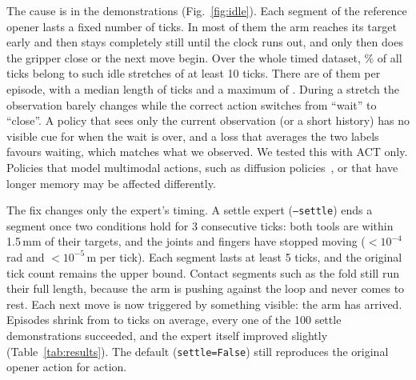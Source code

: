 \documentclass[10pt,twocolumn,letterpaper]{article}
\newcommand{\ttt}[1]{\texttt{\small #1}}
\begin{document}
The cause is in the demonstrations (Fig.~\ref{fig:idle}). Each segment of the reference opener lasts a fixed
number of ticks. In most of them the arm reaches its target early and then stays completely still until the
clock runs out, and only then does the gripper close or the next move begin. Over the whole timed dataset,
\TimedIdlePct\% of all ticks belong to such idle stretches of at least 10 ticks. There are \TimedIdleRuns{} of
them per episode, with a median length of \TimedIdleMedian{} ticks and a maximum of \TimedIdleMax. During a
stretch the observation barely changes while the correct action switches from ``wait'' to ``close''. A policy
that sees only the current observation (or a short history) has no visible cue for when the wait is over, and
a loss that averages the two labels favours waiting, which matches what we observed. We tested this with ACT
only. Policies that model multimodal actions, such as diffusion policies~\cite{diffusion_policy}, or that have
longer memory may be affected differently.

The fix changes only the expert's timing. A settle expert (\ttt{--settle}) ends a segment once two conditions
hold for 3 consecutive ticks: both tools are within 1.5\,mm of their targets, and the joints and fingers have
stopped moving ($<10^{-4}$\,rad and $<10^{-5}$\,m per tick). Each segment lasts at least 5 ticks, and the
original tick count remains the upper bound. Contact segments such as the fold still run their full length,
because the arm is pushing against the loop and never comes to rest. Each next move is now triggered by
something visible: the arm has arrived. Episodes shrink from \TimedLen{} to \SettleLen{} ticks on average,
every one of the 100 settle demonstrations succeeded, and the expert itself improved slightly
(Table~\ref{tab:results}). The default (\ttt{settle=False}) still reproduces the original opener action for
action.
\end{document}
